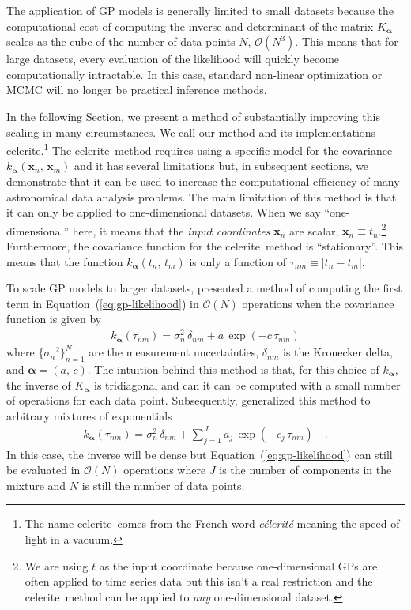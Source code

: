 \documentclass[manuscript, letterpaper]{aastex6}
\makeatletter
\let\origsection\section
\renewcommand\section{\@ifstar{\starsection}{\nostarsection}}
\newcommand\nostarsection[1]{\sectionprelude\origsection{#1}}
\newcommand\starsection[1]{\sectionprelude\origsection*{#1}}
\newcommand\sectionprelude{\vspace{1em}}
\newcommand{\project}[1]{\textsf{#1}}
\newcommand{\celerite}{\project{celerite}}
\newcommand{\foreign}[1]{\emph{#1}}
\renewcommand{\eqref}[1]{\ref{eq:#1}}
\newcommand{\Eq}[1]{Equation~(\eqref{#1})}
\newcommand{\eq}[1]{\Eq{#1}}
\newcommand{\eqlabel}[1]{\label{eq:#1}}
\newcommand{\bvec}[1]{{\ensuremath{\boldsymbol{#1}}}}
\makeatother
\begin{document}
The application of GP models is generally limited to small datasets because
the computational cost of computing the inverse and determinant of the matrix
$K_\bvec{\alpha}$ scales as the cube of the number of data points $N$,
$\mathcal{O}(N^3)$.
This means that for large datasets, every evaluation of the likelihood will
quickly become computationally intractable.
In this case, standard non-linear optimization or MCMC will no longer be
practical inference methods.

In the following Section, we present a method of substantially improving this
scaling in many circumstances.
We call our method and its implementations \celerite.\footnote{The name
\celerite\ comes from the French word \foreign{c\'elerit\'e} meaning the speed
of light in a vacuum.} The \celerite\ method requires using a specific model
for the covariance $k_\bvec{\alpha}(\bvec{x}_n,\,\bvec{x}_m)$ and it has
several limitations but, in subsequent sections, we demonstrate that it can be
used to increase the computational efficiency of many astronomical data
analysis problems.
The main limitation of this method is that it can only be applied to
one-dimensional datasets.
When we say ``one-dimensional'' here, it means that the \emph{input
coordinates} $\bvec{x}_n$ are scalar, $\bvec{x}_n \equiv t_n$.\footnote{We are
using $t$ as the input coordinate because one-dimensional GPs are often
applied to time series data but this isn't a real restriction and the \celerite\
method can be applied to \emph{any} one-dimensional dataset.}
Furthermore, the covariance function for the \celerite\ method is ``stationary''.
This means that the function $k_\bvec{\alpha}(t_n,\,t_m)$ is only a function
of $\tau_{nm} \equiv |t_n - t_m|$.


\section{The celerite model}

To scale GP models to larger datasets, \citet{Rybicki:1995} presented a method
of computing the first term in \eq{gp-likelihood} in $\mathcal{O}(N)$
operations when the covariance function is given by
\begin{eqnarray}\eqlabel{kernel-simple}
k_\bvec{\alpha}(\tau_{nm}) = \sigma_n^2\,\delta_{nm} + a\,\exp(-c\,\tau_{nm})
\end{eqnarray}
where $\{{\sigma_n}^2\}_{n=1}^N$ are the measurement uncertainties,
$\delta_{nm}$ is the Kronecker delta, and $\bvec{\alpha} = (a,\,c)$.
The intuition behind this method is that, for this choice of $k_\bvec{\alpha}$,
the inverse of $K_\bvec{\alpha}$ is tridiagonal and can it can be computed
with a small number of operations for each data point.
Subsequently, \citet{Ambikasaran:2015} generalized this method to arbitrary
mixtures of exponentials
\begin{eqnarray}
k_\bvec{\alpha}(\tau_{nm}) = \sigma_n^2\,\delta_{nm} +
    \sum_{j=1}^J a_j\,\exp(-c_j\,\tau_{nm})\quad.
\end{eqnarray}
In this case, the inverse will be dense but \eq{gp-likelihood} can still be
evaluated in $\mathcal{O}(N)$ operations where $J$ is the number of components
in the mixture and $N$ is still the number of data points.
\end{document}
